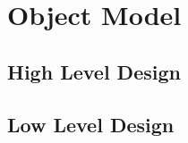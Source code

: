 \section{Object Model}

\subsection{High Level Design}



\newpage
\subsection{Low Level Design}

    
    
    


    


